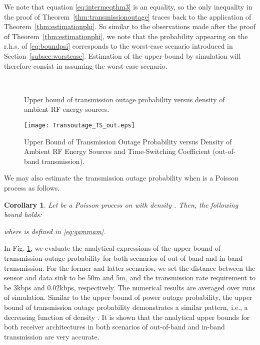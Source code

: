\documentclass[12pt,draftclsnofoot,onecolumn]{IEEEtran}
\newtheorem{corollary}{Corollary}
\begin{document}
We note that equation \eqref{eq:intermeqthm3} is an equality, so the only inequality in the proof of Theorem~\ref{thm:transmissionoutage} traces back to the application of Theorem~\ref{thm:estimationphi}. So similar to the observations made after the proof of Theorem~\ref{thm:estimationphi}, we note that the probability appearing on the r.h.s. of \eqref {eq:boundpsi} corresponds to the worst-case scenario introduced in Section~\ref{subsec:worstcase}. Estimation of the upper-bound by simulation will therefore consist in assuming the worst-case scenario.
  
\begin{figure} 
\centering
{} 
\centering
{} \\
\centering
\caption{Upper bound of transmission outage probability versus density of ambient RF energy sources.}
\label{fig:trans_outage}
\end{figure}    
    
    
\begin{figure}
\centering
\texttt{[image: Transoutage\_TS\_out.eps]}
\caption{Upper Bound of Transmission Outage Probability versus Density of Ambient RF Energy Sources and Time-Switching Coefficient  (out-of-band transmission).} \label{fig:Transoutage_TS_out}
\end{figure}    
    

We may also estimate the transmission outage probability when  is a Poisson process as follows.
\begin{corollary}
Let  be a Poisson process on  with density . Then, the following bound holds:

where  is defined in \eqref{eq:gammam}. 
\end{corollary}
 
In Fig. \ref{fig:trans_outage}, we evaluate the analytical expressions of the upper bound of transmission outage probability for both scenarios of out-of-band and in-band transmission. For the former and latter scenarios, we set the distance between the sensor and data sink  to be 50m and 5m, and the transmission rate requirement to be 3kbps and 0.02kbps, respectively. The numerical results are averaged over  runs of simulation. Similar to the upper bound of power outage probability, the upper bound of transmission outage probability demonstrates a similar pattern, i.e., a decreasing function of density . It is shown that the analytical upper bounds for both receiver architectures in both scenarios of out-of-band and in-band transmission are very accurate.
 
\end{document}
